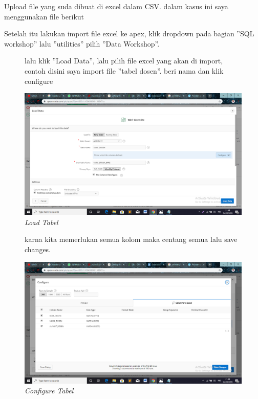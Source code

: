 \begin{enumerate}

\item[1] Upload file yang suda dibuat di excel dalam CSV. dalam kasus ini saya menggunakan file berikut
   


\item[2] Setelah itu lakukan import file excel ke apex, klik dropdown pada bagian ”SQL workshop”
lalu ”utilities” pilih ”Data Workshop”.

\begin{figure}
\item[3]lalu klik ”Load Data”, lalu pilih file excel yang akan di import, contoh disini
saya import file ”tabel dosen”. beri nama dan klik configure
    \begin{center}
\includegraphics[scale=0.4]{apex/ss11.png}
    \caption{\textit{Load Tabel}}
        \end{center}

\end{figure}

\begin{figure}
\item[4]karna kita memerlukan semua kolom maka centang semua lalu save changes.
    \begin{center}
\includegraphics[scale=0.4]{apex/ss10.png}
    \caption{\textit{Configure Tabel}}
        \end{center}
\label{gambar}
\end{figure}


\end{enumerate}

